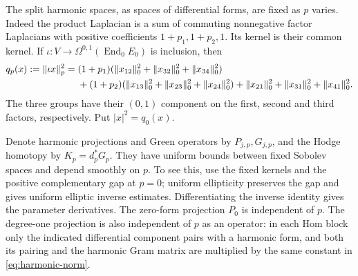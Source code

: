 \documentclass[11pt]{amsart}
\theoremstyle{definition}
\theoremstyle{remark}
\newcommand{\End}{\operatorname{End}}
\begin{document}
The split harmonic spaces, as spaces of differential forms, are fixed
as $p$ varies. Indeed the product Laplacian is a sum of commuting
nonnegative factor Laplacians with positive coefficients
$1+p_1,1+p_2,1$. Its kernel is their common kernel. If $\iota:V\to
\Omega^{0,1}(\End_0E_0)$ is inclusion, then
\begin{align}
 q_p(x):=\|\iota x\|_p^2
 ={}&(1+p_1)(\|x_{12}\|_0^2+\|x_{32}\|_0^2+\|x_{34}\|_0^2)\notag\\
 &+(1+p_2)(\|x_{13}\|_0^2+\|x_{23}\|_0^2+\|x_{24}\|_0^2)
 +\|x_{21}\|_0^2+\|x_{31}\|_0^2+\|x_{41}\|_0^2.\label{eq:harmonic-norm}
\end{align}
The three groups have their $(0,1)$ component on the first, second and
third factors, respectively. Put $|x|^2=q_0(x)$.

Denote harmonic projections and Green operators by $P_{j,p},G_{j,p}$,
and the Hodge homotopy by $K_p=d_p^*G_p$. They have uniform bounds
between fixed Sobolev spaces and depend smoothly on $p$. To see this,
use the fixed kernels and the positive complementary gap at $p=0$;
uniform ellipticity preserves the gap and gives uniform elliptic
inverse estimates. Differentiating the inverse identity gives the
parameter derivatives. The zero-form projection $P_0$ is independent
of $p$. The degree-one projection is also independent of $p$ as an
operator: in each Hom block only the indicated differential component
pairs with a harmonic form, and both its pairing and the harmonic Gram
matrix are multiplied by the same constant in \eqref{eq:harmonic-norm}.
\end{document}
